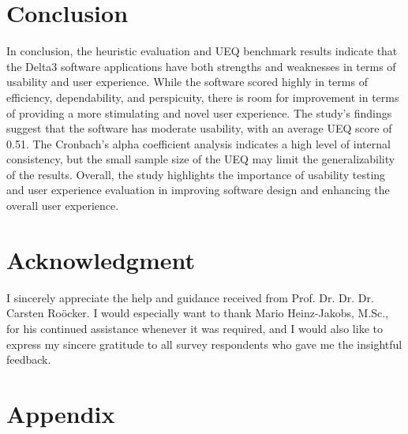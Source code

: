 \documentclass[conference,onecolumn]{IEEEtran}
\begin{document}
\section{Conclusion}
    In conclusion, the heuristic evaluation and UEQ benchmark results indicate that the Delta3 software applications have both strengths and weaknesses in terms of usability and user experience. While the software scored highly in terms of efficiency, dependability, and perspicuity, there is room for improvement in terms of providing a more stimulating and novel user experience. The study's findings suggest that the software has moderate usability, with an average UEQ score of 0.51. The Cronbach's alpha coefficient analysis indicates a high level of internal consistency, but the small sample size of the UEQ may limit the generalizability of the results. Overall, the study highlights the importance of usability testing and user experience evaluation in improving software design and enhancing the overall user experience.
\section*{Acknowledgment}
	I sincerely appreciate the help and guidance received from Prof. Dr. Dr. Dr. Carsten Roöcker. I would especially want to thank Mario Heinz-Jakobs, M.Sc., for his continued assistance whenever it was required, and I would also like to express my sincere gratitude to all survey respondents who gave me the insightful feedback.

\newpage
\section*{Appendix}
\end{document}
